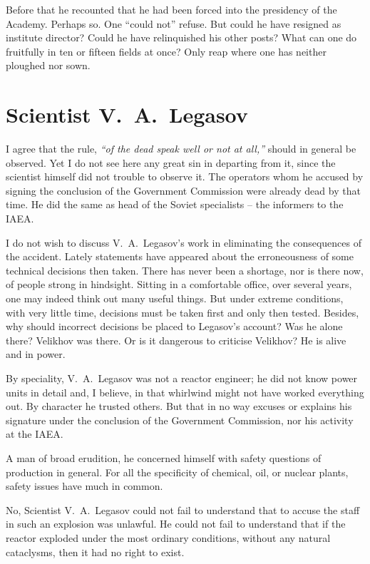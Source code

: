 \documentclass[openright]{bookest}
\begin{document}
Before that he recounted that he had been forced into the presidency of the Academy. Perhaps so. One ``could not'' refuse. But could he have resigned as institute director? Could he have relinquished his other posts? What can one do fruitfully in ten or fifteen fields at once? Only reap where one has neither ploughed nor sown.

\section{Scientist V.~A.~Legasov}

I agree that the rule, \textit{``of the dead speak well or not at all,''} should in general be observed. Yet I do not see here any great sin in departing from it, since the scientist himself did not trouble to observe it. The operators whom he accused by signing the conclusion of the Government Commission were already dead by that time. He did the same as head of the Soviet specialists -- the informers to the IAEA.

I do not wish to discuss V.~A.~Legasov's work in eliminating the consequences of the accident. Lately statements have appeared about the erroneousness of some technical decisions then taken. There has never been a shortage, nor is there now, of people strong in hindsight. Sitting in a comfortable office, over several years, one may indeed think out many useful things. But under extreme conditions, with very little time, decisions must be taken first and only then tested. Besides, why should incorrect decisions be placed to Legasov's account? Was he alone there? Velikhov was there. Or is it dangerous to criticise Velikhov? He is alive and in power.

By speciality, V.~A.~Legasov was not a reactor engineer; he did not know power units in detail and, I believe, in that whirlwind might not have worked everything out. By character he trusted others. But that in no way excuses or explains his signature under the conclusion of the Government Commission, nor his activity at the IAEA.

A man of broad erudition, he concerned himself with safety questions of production in general. For all the specificity of chemical, oil, or nuclear plants, safety issues have much in common.

No, Scientist V.~A.~Legasov could not fail to understand that to accuse the staff in such an explosion was unlawful. He could not fail to understand that if the reactor exploded under the most ordinary conditions, without any natural cataclysms, then it had no right to exist.
\end{document}

